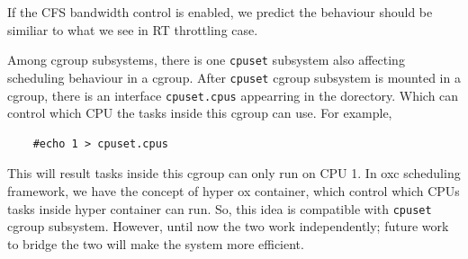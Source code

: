 If the CFS bandwidth control is enabled, we predict the behaviour
should be similiar to what we see in RT throttling case.

Among cgroup subsystems, there is one \texttt{cpuset} subsystem also 
affecting scheduling behaviour in a cgroup.
After \texttt{cpuset} cgroup subsystem is mounted in a cgroup, there is an 
interface \texttt{cpuset.cpus} appearring in the dorectory. Which can control
which CPU the tasks inside this cgroup can use.
For example, 
\begin{lstlisting}
	#echo 1 > cpuset.cpus
\end{lstlisting}
This will result tasks inside this cgroup can only run on CPU 1.
In oxc scheduling framework, we have the concept of hyper ox container, which 
control which CPUs tasks inside hyper container can run. So, this idea is
compatible with \texttt{cpuset} cgroup subsystem. However, until now the two
work independently; future work to bridge the two will make the system more
efficient.

